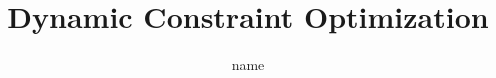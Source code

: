 \documentclass{ddis-thesis}
\author{name}
\title{Dynamic Constraint Optimization}
\begin{document}

\frontmatter






\tableofcontents

\mainmatter











\appendix


\backmatter

\normalfont
\clearpage
\listoffigures

\clearpage
\listoftables
\end{document}

